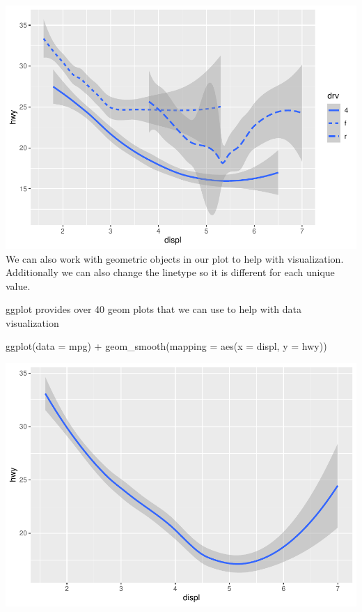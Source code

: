 \documentclass[
]{article}
\newenvironment{Shaded}{\begin{snugshade}}{\end{snugshade}}
\newcommand{\AttributeTok}[1]{\textcolor[rgb]{0.77,0.63,0.00}{#1}}
\newcommand{\FunctionTok}[1]{\textcolor[rgb]{0.00,0.00,0.00}{#1}}
\newcommand{\NormalTok}[1]{#1}
\newcommand{\SpecialCharTok}[1]{\textcolor[rgb]{0.00,0.00,0.00}{#1}}
\begin{document}
\includegraphics{Journal_files/figure-latex/unnamed-chunk-41-3.pdf} We
can also work with geometric objects in our plot to help with
visualization. Additionally we can also change the linetype so it is
different for each unique value.

ggplot provides over 40 geom plots that we can use to help with data
visualization

\begin{Shaded}
\begin{Highlighting}[]
\FunctionTok{ggplot}\NormalTok{(}\AttributeTok{data =}\NormalTok{ mpg) }\SpecialCharTok{+}
  \FunctionTok{geom\_smooth}\NormalTok{(}\AttributeTok{mapping =} \FunctionTok{aes}\NormalTok{(}\AttributeTok{x =}\NormalTok{ displ, }\AttributeTok{y =}\NormalTok{ hwy))}
\end{Highlighting}
\end{Shaded}

\includegraphics{Journal_files/figure-latex/unnamed-chunk-42-1.pdf}
\end{document}
